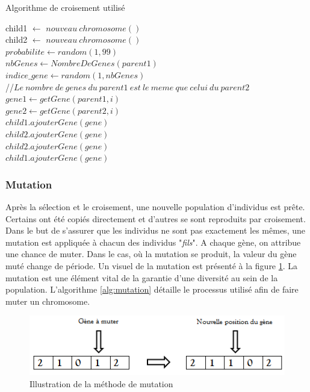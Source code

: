 \documentclass[12pt,a4paper]{article}
\begin{document}
		\begin{algorithm}[H]
 		\caption{Algorithme de croisement utilisé}
 		\label{alg:cross_over}
 		\BlankLine
 		child1 $\gets$ $nouveau\ chromosome()$ \\
 		child2 $\gets$ $nouveau\ chromosome()$ \\
 		$probabilite \gets random(1,99)$ \\
 		\BlankLine
 		{
 			$nbGenes \gets NombreDeGenes(parent1)$\\
 			$indice\_gene \gets random(1, nbGenes)$\\
 			//$ Le \ nombre \ de \ genes \ du \ parent1 \ est \ le \ meme \ que \ celui \ du \ parent2 $\\
 			{
 				$gene1 \gets getGene(parent1, i)$ \\
 				$gene2 \gets getGene(parent2, i)$ \\
 				{
 					$child1.ajouterGene(gene)$ \\
 					$child2.ajouterGene(gene)$ \\
 				}
 				{
 					$child2.ajouterGene(gene)$ \\
 					$child1.ajouterGene(gene)$ \\
 				}
 			}
 		}
		\end{algorithm}
		  
	\subsubsection{Mutation}
	Après la sélection et le croisement, une nouvelle population d'individus est prête. Certains ont été copiés directement et d'autres se sont reproduits par croisement. Dans le but de s'assurer que les individus ne sont pas exactement les mêmes, une mutation est appliquée à chacun des individus "\emph{fils}". A chaque gène, on attribue une chance de muter. Dans le cas, où la mutation se produit, la valeur du gène muté change de période. Un visuel de la mutation est présenté à la figure \ref{fig:used_mutation}. La mutation est une élément vital de la garantie d'une diversité au sein de la population. L'algorithme \ref{alg:mutation} détaille le processus utilisé afin de faire muter un chromosome. 
	
	\begin{figure}[!h]
		\begin{center}
			\includegraphics[scale=.5]{img/mutation_fig.png}
			\caption{Illustration de la méthode de mutation}
			\label{fig:used_mutation}
		\end{center}
	\end{figure}
	
\end{document}
